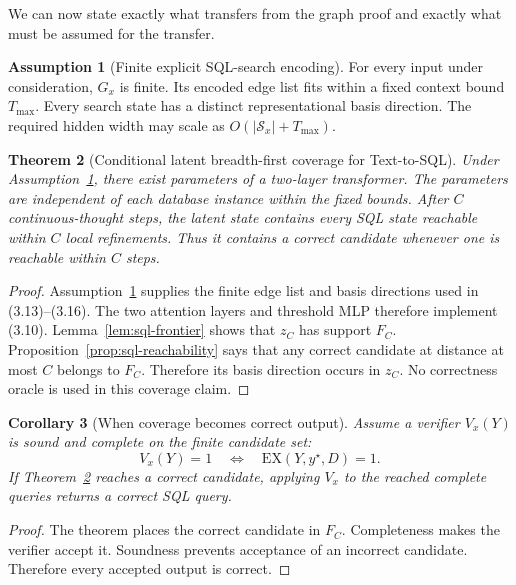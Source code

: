\documentclass[11pt]{article}
\newtheorem{theorem}{Theorem}
\newtheorem{corollary}[theorem]{Corollary}
\theoremstyle{definition}
\newtheorem{assumption}[theorem]{Assumption}
\begin{document}
We can now state exactly what transfers from the graph proof and exactly what must be assumed for the transfer.

\begin{assumption}[Finite explicit SQL-search encoding]
\label{ass:sql-encoding}
For every input under consideration, $G_x$ is finite. Its encoded edge list fits within a fixed context bound $T_{\max}$. Every search state has a distinct representational basis direction. The required hidden width may scale as $O(|\mathcal S_x|+T_{\max})$.
\end{assumption}

\begin{theorem}[Conditional latent breadth-first coverage for Text-to-SQL]
\label{thm:sql-latent-bfs}
Under Assumption~\ref{ass:sql-encoding}, there exist parameters of a two-layer transformer. The parameters are independent of each database instance within the fixed bounds. After $C$ continuous-thought steps, the latent state contains every SQL state reachable within $C$ local refinements. Thus it contains a correct candidate whenever one is reachable within $C$ steps.
\end{theorem}

\begin{proof}
Assumption~\ref{ass:sql-encoding} supplies the finite edge list and basis directions used in (3.13)--(3.16). The two attention layers and threshold MLP therefore implement (3.10). Lemma~\ref{lem:sql-frontier} shows that $z_C$ has support $F_C$. Proposition~\ref{prop:sql-reachability} says that any correct candidate at distance at most $C$ belongs to $F_C$. Therefore its basis direction occurs in $z_C$. No correctness oracle is used in this coverage claim.
\end{proof}

\begin{corollary}[When coverage becomes correct output]
\label{cor:sql-verifier}
Assume a verifier $V_x(Y)$ is sound and complete on the finite candidate set:
\[
V_x(Y)=1
\quad\Longleftrightarrow\quad
\mathrm{EX}(Y,y^\star,D)=1.
\tag{3.18}
\]
If Theorem~\ref{thm:sql-latent-bfs} reaches a correct candidate, applying $V_x$ to the reached complete queries returns a correct SQL query.
\end{corollary}

\begin{proof}
The theorem places the correct candidate in $F_C$. Completeness makes the verifier accept it. Soundness prevents acceptance of an incorrect candidate. Therefore every accepted output is correct.
\end{proof}
\end{document}
